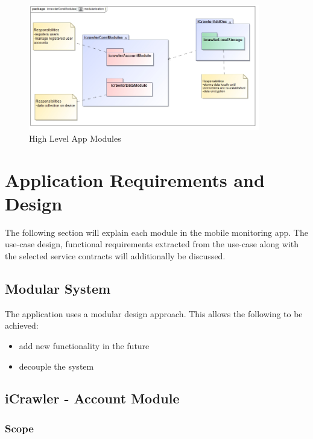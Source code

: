 \documentclass[hidelinks, 12pt, oneside]{article}
\begin{document}
			\begin{figure}[!htbp]
    			\centering
    			\includegraphics[width=0.9\textwidth]{img/highLevelSystem.jpg}
    			\caption{High Level App Modules}
    			\label{fig:highLevelSystem}
			\end{figure}


	\section{Application Requirements and Design}
	The following section will explain each module in the mobile monitoring app. The use-case design, functional requirements extracted from the use-case along with the selected service contracts will additionally be discussed.\newline
	
	\subsection{Modular System}
	 The application uses a modular design approach. This allows the following to be achieved:
	 \begin{itemize}
	\item add new functionality in the future
 	\item decouple the system
	\end{itemize}


	
	\subsection{iCrawler - Account Module}
	\subsubsection{Scope}
	
\end{document}
